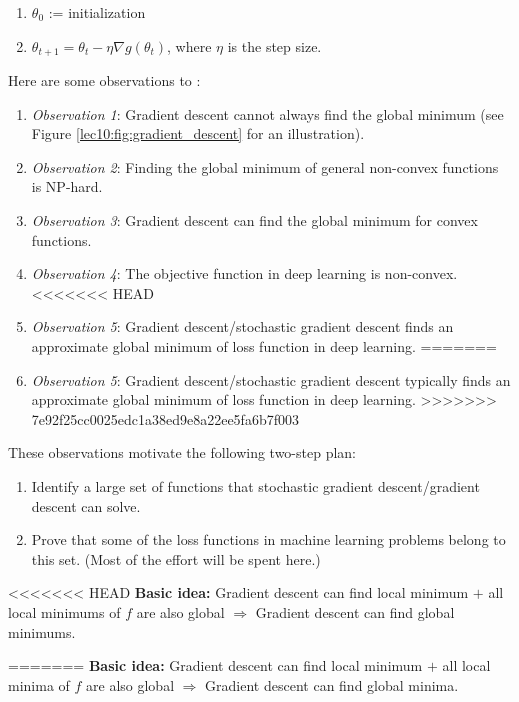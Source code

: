\begin{enumerate}
    \item $\theta_0$ := initialization
    \item $\theta_{t + 1} = \theta_t - \eta\nabla g(\theta_t)$, where $\eta$ is the step size.
\end{enumerate}
Here are some observations to :
\begin{enumerate}
    \item[] \textit{Observation 1}: Gradient descent cannot always find the global minimum (see Figure \ref{lec10:fig:gradient_descent} for an illustration).
    \item[] \textit{Observation 2}: Finding the global minimum of general non-convex functions is NP-hard.
    \item[] \textit{Observation 3}: Gradient descent can find the global minimum for convex functions.
    \item[] \textit{Observation 4}: The objective function in deep learning is non-convex.
<<<<<<< HEAD
    \item[] \textit{Observation 5}: Gradient descent/stochastic gradient descent  finds an approximate global minimum of loss function in deep learning.
=======
    \item[] \textit{Observation 5}: Gradient descent/stochastic gradient descent typically finds an approximate global minimum of loss function in deep learning.
>>>>>>> 7e92f25cc0025edc1a38ed9e8a22ee5fa6b7f003
\end{enumerate}

These observations motivate the following two-step plan:

\begin{enumerate}
    \item Identify a large set of functions that stochastic gradient descent/gradient descent can solve.
    \item Prove that some of the loss functions in machine learning problems belong to this set. (Most of the effort will be spent here.)
\end{enumerate}
<<<<<<< HEAD
\textbf{Basic idea:} Gradient descent can find local minimum $+$ all local minimums of $f$ are also global $\Rightarrow$ Gradient descent can find global minimums.

=======
\textbf{Basic idea:} Gradient descent can find local minimum $+$ all local minima of $f$ are also global $\Rightarrow$ Gradient descent can find global minima.


